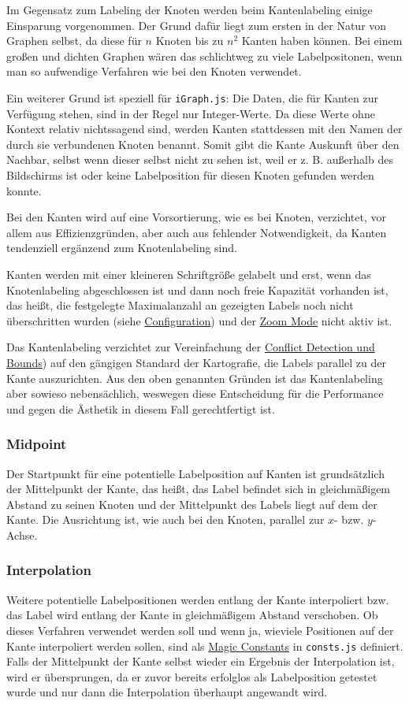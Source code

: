 Im Gegensatz zum Labeling der Knoten werden beim Kantenlabeling einige Einsparung vorgenommen.
Der Grund dafür liegt zum ersten in der Natur von Graphen selbst, da diese für $n$ Knoten bis zu $n^2$ Kanten haben können.
Bei einem großen und dichten Graphen wären das schlichtweg zu viele Labelpositonen, wenn man so aufwendige Verfahren wie bei den Knoten verwendet.

Ein weiterer Grund ist speziell für \texttt{iGraph.js}: Die Daten, die für Kanten zur Verfügung stehen, sind in der Regel nur Integer-Werte.
Da diese Werte ohne Kontext relativ nichtssagend sind, werden Kanten stattdessen mit den Namen der durch sie verbundenen Knoten benannt.
Somit gibt die Kante Auskunft über den Nachbar, selbst wenn dieser selbst nicht zu sehen ist, weil er z. B. außerhalb des Bildschirms ist oder
keine Labelposition für diesen Knoten gefunden werden konnte.

Bei den Kanten wird auf eine Vorsortierung, wie es bei Knoten, verzichtet, vor allem aus Effizienzgründen, aber auch aus fehlender Notwendigkeit, da Kanten tendenziell ergänzend zum Knotenlabeling sind.

Kanten werden mit einer kleineren Schriftgröße gelabelt und erst, wenn das Knotenlabeling abgeschlossen ist und dann noch freie Kapazität vorhanden ist,
das heißt, die festgelegte Maximalanzahl an gezeigten Labels noch nicht überschritten wurden (siehe \hyperref[sec:configuration]{Configuration})
und der \hyperref[subsec:zoom]{Zoom Mode} nicht aktiv ist.

Das Kantenlabeling verzichtet zur Vereinfachung der \hyperref[sec:conflict]{Conflict Detection und Bounds}) auf den gängigen Standard der Kartografie, die Labels
parallel zu der Kante auszurichten.
Aus den oben genannten Gründen ist das Kantenlabeling aber sowieso nebensächlich, weswegen diese Entscheidung für die Performance
und gegen die Ästhetik in diesem Fall gerechtfertigt ist.

\subsubsection{Midpoint}
Der Startpunkt für eine potentielle Labelposition auf Kanten ist grundsätzlich der Mittelpunkt der Kante, das heißt, das Label befindet sich in
gleichmäßigem Abstand zu seinen Knoten und der Mittelpunkt des Labels liegt auf dem der Kante. Die Ausrichtung ist, wie auch bei den Knoten, parallel zur $x$- bzw. $y$-Achse.

\subsubsection{Interpolation}
Weitere potentielle Labelpositionen werden entlang der Kante interpoliert bzw. das Label wird entlang der Kante in gleichmäßigem Abstand verschoben.
Ob dieses Verfahren verwendet werden soll und wenn ja, wieviele Positionen auf der Kante interpoliert werden sollen, sind als \hyperref[subsec:consts]{Magic Constants} in \texttt{consts.js} definiert.
Falls der Mittelpunkt der Kante selbst wieder ein Ergebnis der Interpolation ist, wird er übersprungen, da er zuvor bereits erfolglos als Labelposition getestet wurde und nur dann die Interpolation überhaupt angewandt wird.
